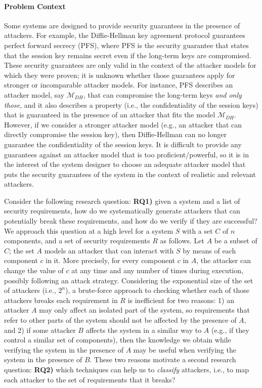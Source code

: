 \paragraph{Problem Context}  
Some systems are designed to provide security guarantees in the presence of attackers. For example, the Diffie-Hellman key agreement protocol guarantees perfect forward secrecy \cite{Gunther1990,Menezes1996} (PFS), where PFS is the security guarantee that states that the session key remains secret even if the long-term keys are compromised. These security guarantees are only valid in the context of the attacker models for which they were proven; it is unknown whether those guarantees apply for stronger or incomparable attacker models. For instance, PFS describes an attacker model, say $\mathcal{M}_{DH}$, that can compromise the long-term keys \emph{and only those}, and it also describes a property (i.e., the confidentiality of the session keys) that is guaranteed in the presence of an attacker that fits the model $\mathcal{M}_{DH}$. However, if we consider a stronger attacker model (e.g., an attacker that can directly compromise the session key), then Diffie-Hellman can no longer guarantee the confidentiality of the session keys. It is difficult to provide any guarantees against an attacker model that is too proficient/powerful, so it is in the interest of the system designer to choose an adequate attacker model that puts the security guarantees of the system in the context of realistic and relevant attackers. 

Consider the following research question: \textbf{RQ1)} given a system and a list of security requirements, how do we systematically generate attackers that can potentially break these requirements, and how do we verify if they are successful? We approach this question at a high level for a system $S$ with a set $C$ of $n$ components, and a set of security requirements $R$ as follows. Let $A$ be a subset of $C$; the set $A$ models an attacker that can interact with $S$ by means of each component $c$ in it. More precisely, for every component $c$ in $A$, the attacker can change the value of $c$ at any time and any number of times during execution, possibly following an attack strategy. Considering the exponential size of the set of attackers (i.e., $2^{n}$), a brute-force approach to checking whether each of those attackers breaks each requirement in $R$ is inefficient for two reasons: 1) an attacker $A$ may only affect an isolated part of the system, so requirements that refer to other parts of the system should not be affected by the presence of $A$, and 2) if some attacker $B$ affects the system in a similar way to $A$ (e.g., if they control a similar set of components), then the knowledge we obtain while verifying the system in the presence of $A$ may be useful when verifying the system in the presence of $B$. These two reasons motivate a second research question: \textbf{RQ2)} which techniques can help us to \emph{classify} attackers, i.e., to map each attacker to the set of requirements that it breaks? 

